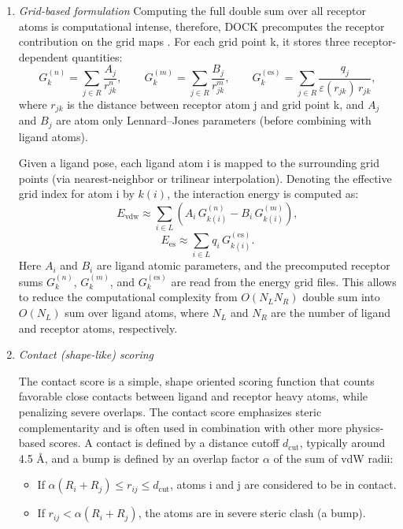 \documentclass[12pt, a4paper]{article}
\begin{document}
\begin{enumerate}
\item \textit{Grid-based formulation}
Computing the full double sum over all receptor atoms is computational intense, therefore, DOCK precomputes the receptor contribution on the grid maps \cite{CH7_Meng1992Grid}. For each grid point k, it stores three receptor-dependent
quantities:
\[
  G^{(n)}_k = \sum_{j \in R}
    \frac{A_j}{r_{jk}^{n}},
  \qquad
  G^{(m)}_k = \sum_{j \in R}
    \frac{B_j}{r_{jk}^{m}},
  \qquad
  G^{(\text{es})}_k =
    \sum_{j \in R}
    \frac{q_j}{\varepsilon(r_{jk})\, r_{jk}},
\]
where $r_{jk}$ is the distance between receptor atom j and grid point k, and $A_j$ and $B_j$ are atom only Lennard--Jones
parameters (before combining with ligand atoms). 

Given a ligand pose, each ligand atom i is mapped to the surrounding grid points (via nearest-neighbor or trilinear
interpolation). Denoting the effective grid index for atom i by $k(i)$, the interaction energy is computed as:
\[
  E_{\text{vdw}} \approx
    \sum_{i \in L}
      \left(
        A_i\, G^{(n)}_{k(i)} -
        B_i\, G^{(m)}_{k(i)}
      \right),
\]
\[
  E_{\text{es}} \approx
    \sum_{i \in L}
      q_i\, G^{(\text{es})}_{k(i)}.
\]
Here $A_i$ and $B_i$ are ligand atomic parameters, and the precomputed receptor sums $G^{(n)}_k$, $G^{(m)}_k$, and
$G^{(\text{es})}_k$ are read from the energy grid files. This allows to reduce the computational complexity from $O(N_L N_R)$ double sum into $O(N_L)$ sum over ligand atoms, where $N_L$ and $N_R$ are the number of ligand and receptor atoms, respectively.

\item \textit{Contact (shape-like) scoring}

The contact score is a simple, shape oriented scoring function that counts favorable close contacts between ligand and receptor heavy atoms, while penalizing severe overlaps. The contact score emphasizes steric complementarity and is often used in combination with other more physics-based scores. A contact is defined by a distance cutoff $d_{\text{cut}}$, typically around 4.5 \r{A}, and a bump is defined by an overlap factor $\alpha$ of the sum of vdW radii:

\begin{itemize}
  \item If
        $\alpha (R_i + R_j) \le r_{ij} \le d_{\text{cut}}$, atoms i and j are considered to be in contact.
  \item If
        $r_{ij} < \alpha (R_i + R_j)$, the atoms are in severe steric clash (a bump).
\end{itemize}


\end{enumerate}
\end{document}

